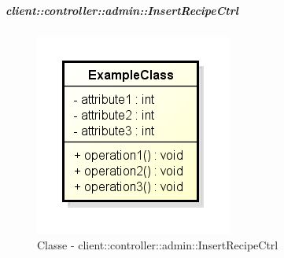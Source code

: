 		\subparagraph{client::controller::admin::InsertRecipeCtrl} %
		\label{subp:bdsm_app_client_controller_admin_insertctrl}
			\begin{figure}[htbp]
				\centering
				\centerline{\includegraphics[scale=0.7]{./images/client/classes/example_class.png}}
				\caption{Classe - client::controller::admin::InsertRecipeCtrl}
			\end{figure}
